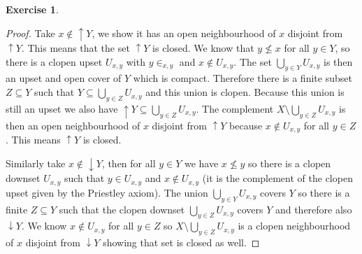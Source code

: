 \documentclass{article}
\theoremstyle{definition}
\newtheorem{question}{Exercise}
\begin{document}
\begin{question}
\begin{enumerate}[(a)]
              \begin{proof}
                  Take \(x\notin\uparrow Y\), we show it has an open
                  neighbourhood of \(x\) disjoint from \(\uparrow Y\). This
                  means that the set \(\uparrow Y\) is closed. We know that
                  \(y\not\leq x\) for all \(y\in Y\), so there is a clopen upset
                  \(U_{x,y}\) with \(y\in _{x,y}\) and \(x\notin U_{x,y}\). The
                  set \(\bigcup_{y\in Y}U_{x,y}\) is then an upset and open
                  cover of \(Y\) which is compact. Therefore there is a finite
                  subset \(Z\subseteq Y\) such that \(Y\subseteq\bigcup_{y\in
                      Z}U_{x,y}\) and this union is clopen. Because this union is
                  still an upset we also have \(\uparrow Y\subseteq\bigcup_{y\in
                      Z}U_{x,y}\). The complement \(X\setminus\bigcup_{y\in
                      Z}U_{x,y}\) is then an open neighbourhood of \(x\) disjoint
                  from \(\uparrow Y\) because \(x\notin U_{x,y}\) for all \(y\in
                  Z\). This means \(\uparrow Y\) is closed.

                  Similarly take \(x\notin\downarrow Y\), then for all \(y\in
                  Y\) we have \(x\not\leq y\) so there is a clopen downset
                  \(U_{x,y}\) such that \(y\in U_{x,y}\) and \(x\notin U_{x,y}\)
                  (it is the complement of the clopen upset given by the
                  Priestley axiom). The union \(\bigcup_{y\in Y}U_{x,y}\) covers
                  \(Y\) so there is a finite \(Z\subseteq Y\) such that the
                  clopen downset \(\bigcup_{y\in Z}U_{x,y}\) covers \(Y\) and
                  therefore also \(\downarrow Y\). We know \(x\notin U_{x,y}\)
                  for all \(y\in Z\) so \(X\setminus\bigcup_{y\in Z}U_{x,y}\) is
                  a clopen neighbourhood of \(x\) disjoint from \(\downarrow Y\)
                  showing that set is closed as well.
              \end{proof}
    \end{enumerate}
\end{question}
\end{document}
